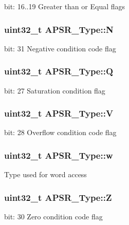 bit\-: 16..19 Greater than or Equal flags \hypertarget{union_a_p_s_r___type_a7e7bbba9b00b0bb3283dc07f1abe37e0}{
\subsubsection[{N}]{\setlength{\rightskip}{0pt plus 5cm}uint32\-\_\-t A\-P\-S\-R\-\_\-\-Type\-::\-N}}\label{union_a_p_s_r___type_a7e7bbba9b00b0bb3283dc07f1abe37e0}
bit\-: 31 Negative condition code flag \hypertarget{union_a_p_s_r___type_a22d10913489d24ab08bd83457daa88de}{
\subsubsection[{Q}]{\setlength{\rightskip}{0pt plus 5cm}uint32\-\_\-t A\-P\-S\-R\-\_\-\-Type\-::\-Q}}\label{union_a_p_s_r___type_a22d10913489d24ab08bd83457daa88de}
bit\-: 27 Saturation condition flag \hypertarget{union_a_p_s_r___type_a8004d224aacb78ca37774c35f9156e7e}{
\subsubsection[{V}]{\setlength{\rightskip}{0pt plus 5cm}uint32\-\_\-t A\-P\-S\-R\-\_\-\-Type\-::\-V}}\label{union_a_p_s_r___type_a8004d224aacb78ca37774c35f9156e7e}
bit\-: 28 Overflow condition code flag \hypertarget{union_a_p_s_r___type_ae4c2ef8c9430d7b7bef5cbfbbaed3a94}{
\subsubsection[{w}]{\setlength{\rightskip}{0pt plus 5cm}uint32\-\_\-t A\-P\-S\-R\-\_\-\-Type\-::w}}\label{union_a_p_s_r___type_ae4c2ef8c9430d7b7bef5cbfbbaed3a94}
Type used for word access \hypertarget{union_a_p_s_r___type_a3b04d58738b66a28ff13f23d8b0ba7e5}{
\subsubsection[{Z}]{\setlength{\rightskip}{0pt plus 5cm}uint32\-\_\-t A\-P\-S\-R\-\_\-\-Type\-::\-Z}}\label{union_a_p_s_r___type_a3b04d58738b66a28ff13f23d8b0ba7e5}
bit\-: 30 Zero condition code flag 

